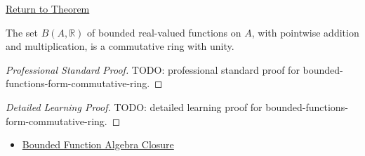 \newpage
{}
\label{prf:bounded-functions-form-commutative-ring}

\begin{remark*}[Return]
\hyperref[thm:bounded-functions-form-commutative-ring]{Return to Theorem}
\end{remark*}

\begin{theorem*}
The set \(B(A,\mathbb{R})\) of bounded real-valued functions on \(A\), with
pointwise addition and multiplication, is a commutative ring with unity.
\end{theorem*}

\begin{proof}[Professional Standard Proof]
\LRAProofBodyStart
TODO: professional standard proof for bounded-functions-form-commutative-ring.
\end{proof}

\begin{proof}[Detailed Learning Proof]
\LRAProofBodyStart
TODO: detailed learning proof for bounded-functions-form-commutative-ring.
\end{proof}

\begin{remark*}
\end{remark*}

\begin{dependencies}
\begin{itemize}
  \item \hyperref[thm:bounded-function-algebra-closure]{Bounded Function Algebra Closure}
\end{itemize}
\end{dependencies}

\clearpage
